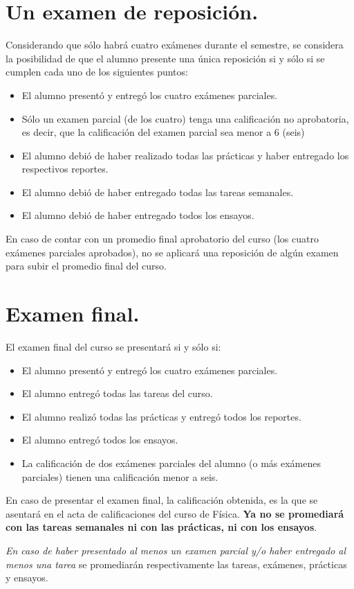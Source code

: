 \documentclass[12pt]{article}
\begin{document}
\section{Un examen de reposición.}
Considerando que sólo habrá cuatro exámenes durante el semestre, se considera la posibilidad de que el alumno presente una única reposición si y sólo si se cumplen cada uno de los siguientes puntos:
\begin{itemize}
\item El alumno presentó y entregó los cuatro exámenes parciales.
\item Sólo un examen parcial (de los cuatro) tenga una calificación no aprobatoria, es decir, que la calificación del examen parcial sea menor a $6$ (seis)
\item El alumno debió de haber realizado todas las prácticas y haber entregado los respectivos reportes.
\item El alumno debió de haber entregado todas las tareas semanales.
\item El alumno debió de haber entregado todos los ensayos.
\end{itemize}
En caso de contar con un promedio final aprobatorio del curso (los cuatro exámenes parciales aprobados), no se aplicará una reposición de algún examen para subir el promedio final del curso.
\section{Examen final.}
El examen final del curso se presentará si y sólo si:
\begin{itemize}
\item El alumno presentó y entregó los cuatro exámenes parciales.
\item El alumno entregó todas las tareas del curso.
\item El alumno realizó todas las prácticas y entregó todos los reportes.
\item El alumno entregó todos los ensayos.
\item La calificación de dos exámenes parciales del alumno (o más exámenes parciales) tienen una calificación menor a seis.
\end{itemize}
En caso de presentar el examen final, la calificación obtenida, es la que se asentará en el acta de calificaciones del curso de Física. \textbf{Ya no se promediará con las tareas semanales ni con las prácticas, ni con los ensayos}.
\par
\emph{En caso de haber presentado al menos un examen parcial y/o haber entregado al menos una tarea} se promediarán respectivamente las tareas, exámenes, prácticas y ensayos.
\end{document}
